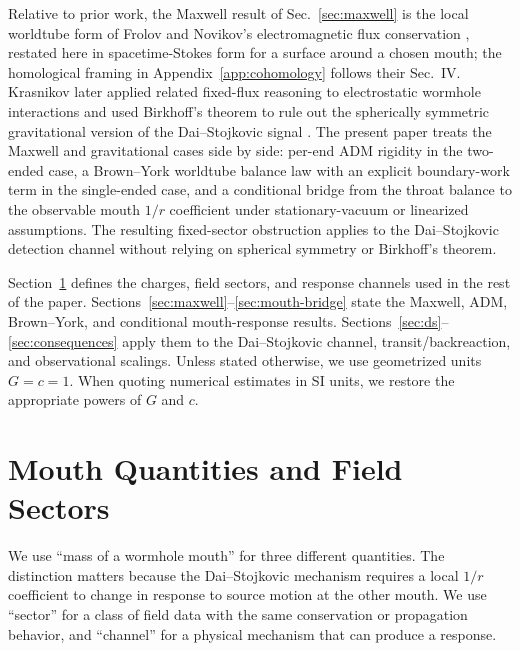 \documentclass[aps,prd,10pt,onecolumn,nofootinbib,superscriptaddress,floatfix]{revtex4-2}
\begin{document}
Relative to prior work, the Maxwell result of Sec.~\ref{sec:maxwell} is the
local worldtube form of Frolov and Novikov's electromagnetic flux conservation
\cite{FrolovNovikov1990PhysicalEffects}, restated here in spacetime-Stokes
form for a surface around a chosen mouth; the homological framing in
Appendix~\ref{app:cohomology} follows their Sec.~IV.  Krasnikov later applied
related fixed-flux reasoning to electrostatic wormhole interactions and used
Birkhoff's theorem to rule out the spherically symmetric gravitational version
of the Dai--Stojkovic signal
\cite{Krasnikov2008ElectrostaticInteraction,Krasnikov2020CommentObserving}.
The present paper treats the Maxwell and gravitational cases side by side:
per-end ADM rigidity in the two-ended case, a Brown--York worldtube balance
law with an explicit boundary-work term in the single-ended case, and a
conditional bridge from the throat balance to the observable mouth $1/r$
coefficient under stationary-vacuum or linearized assumptions.  The resulting
fixed-sector obstruction applies to the Dai--Stojkovic detection channel
without relying on spherical symmetry or Birkhoff's theorem.

Section~\ref{sec:quantities} defines the charges, field sectors, and response
channels used in the rest of the paper.  Sections~\ref{sec:maxwell}--\ref{sec:mouth-bridge}
state the Maxwell, ADM, Brown--York, and conditional mouth-response results.
Sections~\ref{sec:ds}--\ref{sec:consequences} apply them to the
Dai--Stojkovic channel, transit/backreaction, and observational scalings.
Unless stated otherwise, we use geometrized units $G=c=1$.  When quoting
numerical estimates in SI units, we restore the appropriate powers of $G$ and
$c$.

\section{Mouth Quantities and Field Sectors}
\label{sec:quantities}

We use ``mass of a wormhole mouth'' for three different quantities.  The
distinction matters because the Dai--Stojkovic mechanism requires a local
$1/r$ coefficient to change in response to source motion at the other mouth.
We use ``sector'' for a class of field data with the same conservation or
propagation behavior, and ``channel'' for a physical mechanism that can produce
a response.
\end{document}
